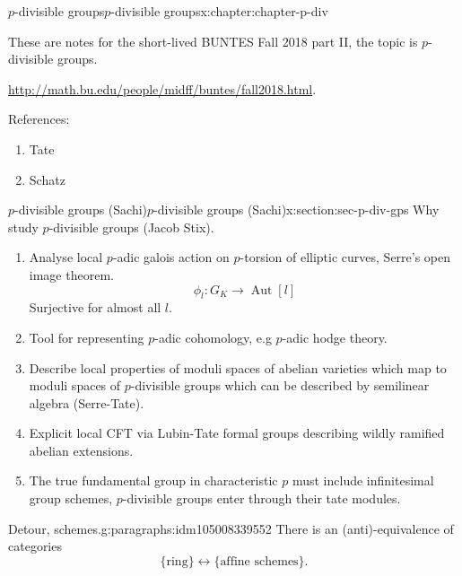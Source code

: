 \documentclass[oneside,10pt,]{book}
\numberwithin{equation}{section}
\newcommand{\lb}{[}
\newcommand{\rb}{]}
\DeclareMathOperator{\Aut}{Aut}
\begin{document}
\begin{chapterptx}{\(p\)-divisible groups}{}{\(p\)-divisible groups}{}{}{x:chapter:chapter-p-div}
\begin{introduction}{}%
These are notes for the short-lived BUNTES Fall 2018 part II, the topic is \(p\)-divisible groups.%
\par
\url{http://math.bu.edu/people/midff/buntes/fall2018.html}.%
\par
References:%
\begin{enumerate}
\item{}Tate%
\item{}Schatz%
\end{enumerate}
%
\end{introduction}%
%
%
\typeout{************************************************}
\typeout{************************************************}
%
\begin{sectionptx}{\(p\)-divisible groups (Sachi)}{}{\(p\)-divisible groups (Sachi)}{}{}{x:section:sec-p-div-gps}
Why study  \(p\)-divisible groups (Jacob Stix).%
\begin{enumerate}
\item{}Analyse local \(p\)-adic galois action on \(p\)-torsion of elliptic curves, Serre's open image theorem.%
\begin{equation*}
\phi_l \colon G_K \to \Aut \lb l \rb
\end{equation*}
Surjective for almost all \(l\).%
\item{}Tool for representing \(p\)-adic cohomology, e.g \(p\)-adic hodge theory.%
\item{}Describe local properties of moduli spaces of abelian varieties which map to moduli spaces of \(p\)-divisible groups which can be described by semilinear algebra (Serre-Tate).%
\item{}Explicit local CFT via Lubin-Tate formal groups describing wildly ramified abelian extensions.%
\item{}The true fundamental group in characteristic \(p\) must include infinitesimal group schemes, \(p\)-divisible groups enter through their tate modules.%
\end{enumerate}
%
\begin{paragraphs}{Detour, schemes.}{g:paragraphs:idm105008339552}%
There is an (anti)-equivalence of categories%
\begin{equation*}
\{\text{ring}\} \leftrightarrow\{\text{affine schemes}\}\text{.}
\end{equation*}

\end{paragraphs}
\end{sectionptx}
\end{chapterptx}
\end{document}
